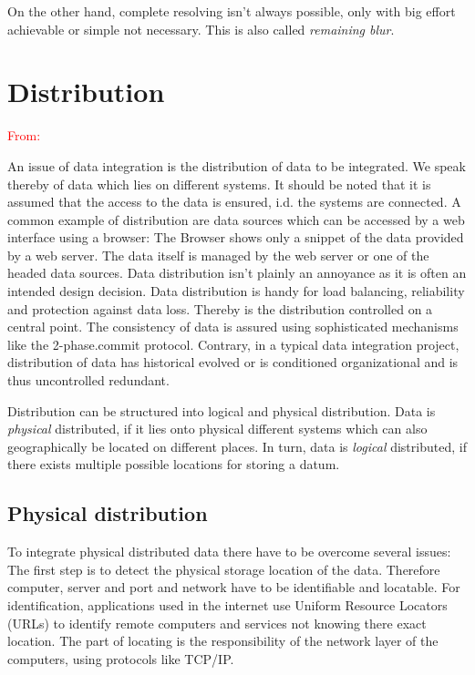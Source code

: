 On the other hand, complete resolving isn't always possible, only with big effort achievable or  simple not necessary. This is also called \textit{remaining blur}.

\section{Distribution}
\textcolor{red}{From: \cite[chapter 3.1 (p.51-54)]{DBLP:books/dp/LeserN2006}}

An issue of data integration is the distribution of data to be integrated. We speak thereby of data which lies on different systems. It should be noted that it is assumed that the access to the data is ensured, i.d. the systems are connected. A common example of distribution are data sources which can be accessed by a web interface using a browser: The Browser shows only a snippet of the data provided by a web server. The data itself is managed by the web server or one of the headed data sources. 
Data distribution isn't plainly an annoyance as it is often an intended design decision. Data distribution is handy for load balancing, reliability and protection against data loss. Thereby is the distribution controlled on a central point. The consistency of data is assured using sophisticated mechanisms like the 2-phase.commit protocol. Contrary, in a typical data integration project, distribution of data has historical evolved or is conditioned organizational and is thus uncontrolled redundant.

Distribution can be structured into logical and physical distribution. Data is \textit{physical} distributed, if it lies onto physical different systems which can also geographically be located on different places. In turn, data is \textit{logical} distributed, if there exists multiple possible locations for storing a datum. 

\subsection{Physical distribution}
To integrate physical distributed data there have to be overcome several issues: The first step is to detect the physical storage location of the data. Therefore computer, server and port and network have to be identifiable and locatable. For identification, applications used in the internet use Uniform Resource Locators (URLs) to identify remote computers and services not knowing there exact location. The part of locating is the responsibility of the network layer of the computers, using protocols like TCP/IP.

